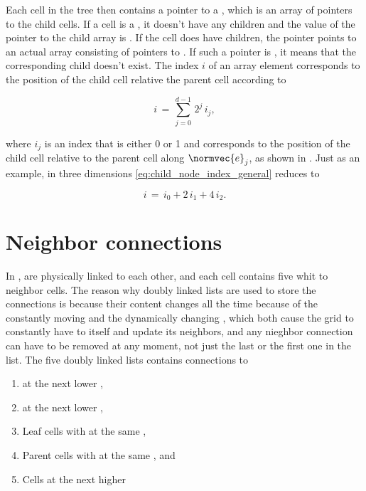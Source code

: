 Each cell in the tree then contains a pointer to a , which is an array of pointers to the child cells. If a cell is a , it doesn't have any children and the value of the pointer to the child array is \NULL. If the cell does have children, the pointer points to an actual array consisting of \numchildren pointers to . If such a pointer is \NULL, it means that the corresponding child doesn't exist. The index $i$ of an array element corresponds to the position of the child cell relative the parent cell according to

\begin{equation} \label{eq:child_node_index_general}
i \,=\, \sum_{j=0}^{d-1} \,2^j\,i_j,
\end{equation}

where $i_j$ is an index that is either 0 or 1 and corresponds to the position of the child cell relative to the parent cell along $\normvec{e}_j$, as shown in . Just as an example, in three dimensions \eqref{eq:child_node_index_general} reduces to

\begin{equation} \label{eq:child_node_index_three_dimensions}
i \,=\, i_0 + 2\,i_1 + 4\,i_2.
\end{equation}

\section{Neighbor connections}

In \thisprojectwork,  are physically linked to each other, and each cell contains five  whit  to neighbor cells. The reason why doubly linked lists are used to store the connections is because their content changes all the time because of the constantly moving  and the dynamically changing \LODs, which both cause the grid to constantly have to \remesh itself and update its neighbors, and any nieghbor connection can have to be removed at any moment, not just the last or the first one in the list. The five doubly linked lists contains connections to

\begin{enumerate}
    \item {} at the next lower \LOD,
    \item {} at the next lower \LOD,
    \item Leaf cells with at the same \LOD,
    \item Parent cells with at the same \LOD, and
    \item Cells at the next higher \LOD
\end{enumerate}

